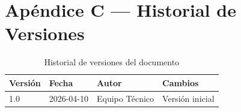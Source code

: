 \documentclass[12pt,a4paper,twoside]{report}
\begin{document}
\chapter{Ap\'endice C --- Historial de Versiones}

\begin{table}[H]
\centering
\caption{Historial de versiones del documento}
\begin{tabular}{llll}
\toprule
\textbf{Versi\'on} & \textbf{Fecha} & \textbf{Autor} & \textbf{Cambios} \\
\midrule
1.0 & 2026-04-10 & Equipo T\'ecnico & Versi\'on inicial \\
\bottomrule
\end{tabular}
\end{table}
\end{document}
